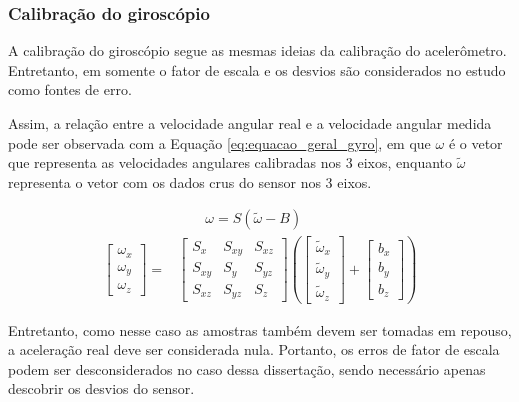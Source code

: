 \documentclass[acronym, symbols, table, deposito]{fei}
\begin{document}
		\subsubsection{Calibração do giroscópio}\label{sec:calibracao_giroscopio}
		
		A calibração do giroscópio segue as mesmas ideias da calibração do acelerômetro. Entretanto, em \textcite{hassan2020field} somente o fator de escala e os desvios são considerados no estudo como fontes de erro.
		
		Assim, a relação entre a velocidade angular real e a velocidade angular medida pode ser observada com a Equação \eqref{eq:equacao_geral_gyro}, em que $\omega$ é o vetor que representa as velocidades angulares calibradas nos 3 eixos, enquanto $\tilde{\omega}$ representa o vetor com os dados crus do sensor nos 3 eixos.
		
		\begin{equation}\label{eq:equacao_geral_gyro}
			\begin{split}
				&\quad \quad \omega = S(\tilde{\omega} - B) \\
				\begin{bmatrix}
					\omega_x \\ \omega_y \\ \omega_z
				\end{bmatrix} = 
				&\begin{bmatrix}
					S_x & S_{xy} & S_{xz} \\ S_{xy} & S_y & S_{yz} \\ S_{xz} & S_{yz} & S_z
				\end{bmatrix} \left(
				\begin{bmatrix}
					\tilde{\omega}_x \\ \tilde{\omega}_y \\ \tilde{\omega}_z
				\end{bmatrix} + 
				\begin{bmatrix}
					b_x \\ b_y \\ b_z
				\end{bmatrix}\right)
			\end{split}
		\end{equation}
		
		Entretanto, como nesse caso as amostras também devem ser tomadas em repouso, a aceleração real deve ser considerada nula. Portanto, os erros de fator de escala podem ser desconsiderados no caso dessa dissertação, sendo necessário apenas descobrir os desvios do sensor.
				
\end{document}
